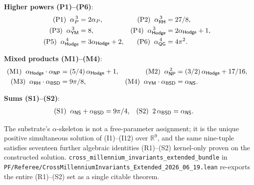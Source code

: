 \documentclass[11pt,a4paper]{amsart}
\theoremstyle{plain}
\theoremstyle{definition}
\begin{document}
\noindent\textbf{Higher powers \textup{(P1)--(P6)}}:
\begin{align*}
\textup{(P1)}\;\; \alpha_P^{\,3}      &= 2\alpha_P,             & \textup{(P2)}\;\; \alpha_{\textsf{RH}}^{\,3}     &= 27/8,\\
\textup{(P3)}\;\; \alpha_{\textsf{YM}}^{\,3}     &= 8,                    & \textup{(P4)}\;\; \alpha_{\textsf{Hodge}}^{\,3}  &= 2\alpha_{\textsf{Hodge}} + 1,\\
\textup{(P5)}\;\; \alpha_{\textsf{Hodge}}^{\,4}  &= 3\alpha_{\textsf{Hodge}} + 2, & \textup{(P6)}\;\; \alpha_{\textsf{QG}}^{\,4}     &= 4\pi^2.
\end{align*}

\noindent\textbf{Mixed products \textup{(M1)--(M4)}}:
\begin{align*}
\textup{(M1)}\;\; \alpha_{\textsf{Hodge}}\cdot\alpha_{\textsf{NP}} &= (5/4)\,\alpha_{\textsf{Hodge}} + 1, & \textup{(M2)}\;\; \alpha_{\textsf{NP}}^{\,2}              &= (3/2)\,\alpha_{\textsf{Hodge}} + 17/16,\\
\textup{(M3)}\;\; \alpha_{\textsf{RH}}\cdot\alpha_{\textsf{BSD}}    &= 9\pi/8,                              & \textup{(M4)}\;\; \alpha_{\textsf{YM}}\cdot\alpha_{\textsf{BSD}}  &= \alpha_{\textsf{NS}}.
\end{align*}

\noindent\textbf{Sums \textup{(S1)--(S2)}}:
\begin{align*}
\textup{(S1)}\;\; \alpha_{\textsf{NS}} + \alpha_{\textsf{BSD}}  &= 9\pi/4,&
\textup{(S2)}\;\; 2\,\alpha_{\textsf{BSD}}     &= \alpha_{\textsf{NS}}.
\end{align*}

The substrate's $\alpha$-skeleton is not a free-parameter assignment; it is the unique positive simultaneous solution of (I1)--(I12) over $\mathbb{R}^9$, and the same nine-tuple satisfies seventeen further algebraic identities (R1)--(S2) kernel-only proven on the constructed solution. \texttt{cross\_millennium\_invariants\_extended\_bundle} in \texttt{PF/Referee/CrossMillenniumInvariants\_Extended\_2026\_06\_19.lean} re-exports the entire (R1)--(S2) set as a single citable theorem.
\end{document}
